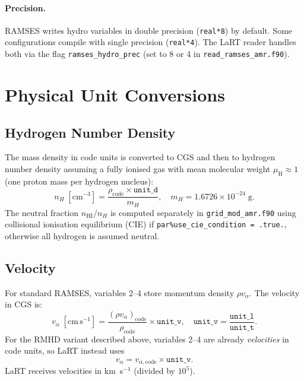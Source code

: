 \documentclass[english,a4paper]{my_memo}
\begin{document}
\paragraph{Precision.}
RAMSES writes hydro variables in double precision (\texttt{real*8}) by
default.  Some configurations compile with single precision (\texttt{real*4}).
The LaRT reader handles both via the flag \texttt{ramses\_hydro\_prec}
(set to 8 or 4 in \texttt{read\_ramses\_amr.f90}).

\section{Physical Unit Conversions}

\subsection{Hydrogen Number Density}

The mass density in code units is converted to CGS and then to hydrogen
number density assuming a fully ionised gas with mean molecular weight
$\mu_\mathrm{H} \approx 1$ (one proton mass per hydrogen nucleus):
\begin{equation}
  n_H \;[\mathrm{cm}^{-3}]
  = \frac{\rho_\mathrm{code} \times \texttt{unit\_d}}{m_H},
  \quad m_H = 1.6726 \times 10^{-24}\;\mathrm{g}.
\end{equation}
The neutral fraction $n_\mathrm{HI}/n_H$ is computed separately in
\texttt{grid\_mod\_amr.f90} using collisional ionisation equilibrium (CIE) if
\texttt{par\%use\_cie\_condition = .true.}, otherwise all hydrogen is assumed
neutral.

\subsection{Velocity}

For standard RAMSES, variables 2--4 store momentum density $\rho v_\alpha$.
The velocity in CGS is:
\begin{equation}
  v_\alpha \;[\mathrm{cm\,s}^{-1}]
  = \frac{(\rho v_\alpha)_\mathrm{code}}{\rho_\mathrm{code}}
    \times \texttt{unit\_v},
  \quad \texttt{unit\_v} = \frac{\texttt{unit\_l}}{\texttt{unit\_t}}.
\end{equation}
For the RMHD variant described above, variables 2--4 are already
\emph{velocities} in code units, so LaRT instead uses
\begin{equation}
  v_\alpha = v_{\alpha,\mathrm{code}} \times \texttt{unit\_v}.
\end{equation}
LaRT receives velocities in km~s$^{-1}$ (divided by $10^5$).
\end{document}
